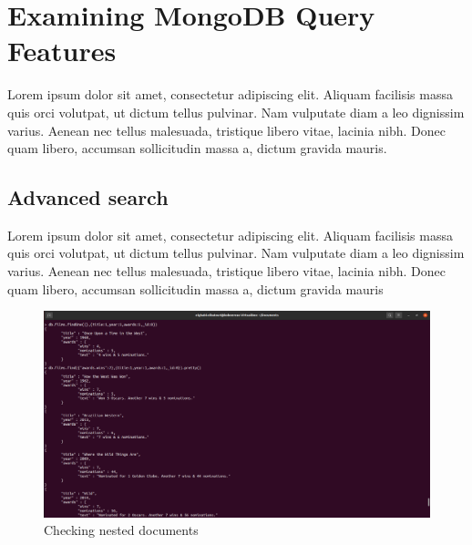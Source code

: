 \chapter{Examining MongoDB Query Features}
\par Lorem ipsum dolor sit amet, consectetur adipiscing elit. Aliquam facilisis massa quis orci volutpat, ut dictum tellus pulvinar. Nam vulputate diam a leo dignissim varius. Aenean nec tellus malesuada, tristique libero vitae, lacinia nibh. Donec quam libero, accumsan sollicitudin massa a, dictum gravida mauris.
\begin{spacing}{1.2}
\section{Advanced search }
\par Lorem ipsum dolor sit amet, consectetur adipiscing elit. Aliquam facilisis massa quis orci volutpat, ut dictum tellus pulvinar. Nam vulputate diam a leo dignissim varius. Aenean nec tellus malesuada, tristique libero vitae, lacinia nibh. Donec quam libero, accumsan sollicitudin massa a, dictum gravida mauris
\\
\begin{figure}[!htb] 
\begin{center} 
\includegraphics[width=1\linewidth]{Pictures/MongoDB/Examining MongoDB Query Features/Advanced search/Checking nested documents} 
\end{center} 
\caption{Checking nested documents} 
\end{figure}  \FloatBarrier
\\


\end{spacing}
